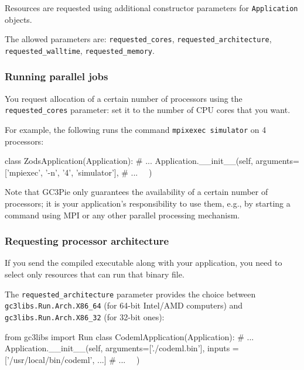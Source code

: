 \documentclass[english,serif,mathserif,xcolor=pdftex,dvipsnames,table]{beamer}
\begin{document}
\begin{frame}[fragile]
  Resources are requested using additional constructor parameters for
  \texttt{Application} objects.

  \+
  The allowed parameters are:
  \lstinline|requested_cores|,
  \lstinline|requested_architecture|,
  \lstinline|requested_walltime|,
  \lstinline|requested_memory|.
\end{frame}


\begin{frame}[fragile]
  \frametitle{Running parallel jobs}

  You request allocation of a certain number of processors using the
  \lstinline|requested_cores| parameter: set it to the number of CPU
  cores that you want.

  \+
  For example, the following runs the command \texttt{mpixexec
    simulator} on 4 processors:
  \begin{python}
  class ZodsApplication(Application):
    # ...
    Application.__init__(self,
      arguments=['mpiexec', '-n', '4', 'simulator'],
      # ...
      ~~)
  \end{python}

  \+
  {\small Note that GC3Pie only guarantees the availability of a certain
    number of processors; it is your application's responsibility to use
    them, e.g., by starting a command using MPI or any other parallel
    processing mechanism.}
\end{frame}


\begin{frame}[fragile]
  \frametitle{Requesting processor architecture}

  If you send the compiled executable along with your application, you
  need to select only resources that can run that binary file.

  \+
  The \lstinline|requested_architecture| parameter provides the
  choice between \lstinline|gc3libs.Run.Arch.X86_64| (for 64-bit
  Intel/AMD computers) and \lstinline|gc3libs.Run.Arch.X86_32| (for
  32-bit ones):
  \begin{python}
  from gc3libs import Run
  class CodemlApplication(Application):
    # ...
    Application.__init__(self,
      arguments=['./codeml.bin'],
      inputs = ['/usr/local/bin/codeml', ...]
      # ...
      ~~)
  \end{python}
\end{frame}
\end{document}
